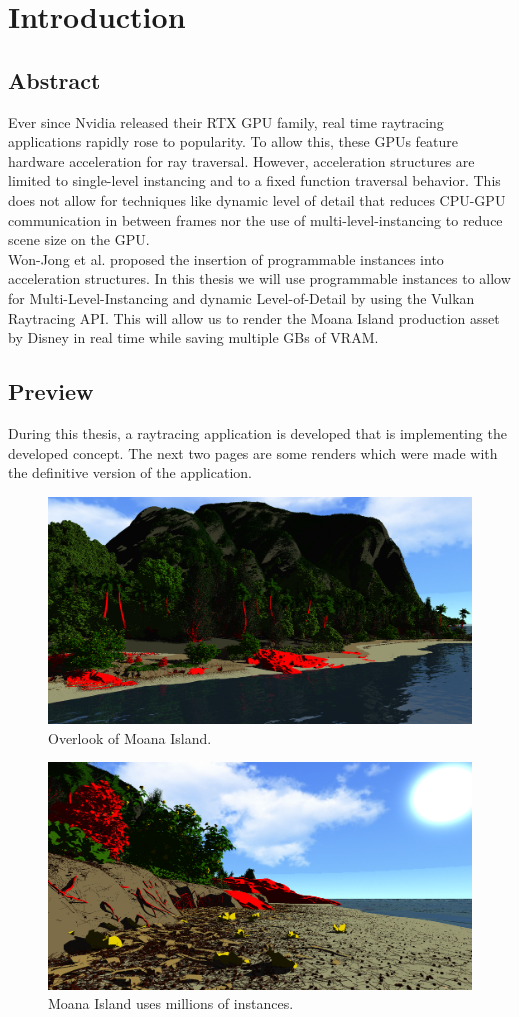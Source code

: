 \chapter{Introduction}
\section{Abstract}
\label{sec:abstract}
Ever since Nvidia released their RTX GPU family, real time raytracing applications rapidly rose to popularity. To allow this, these GPUs feature hardware acceleration for ray traversal. However, acceleration structures are limited to single-level instancing and to a fixed function traversal behavior. This does not allow for techniques like dynamic level of detail that reduces CPU-GPU communication in between frames nor the use of multi-level-instancing to reduce scene size on the GPU.\\ Won-Jong et al. \cite{traversalArticle} proposed the insertion of programmable instances into acceleration structures. In this thesis we will use programmable instances to allow for Multi-Level-Instancing and dynamic Level-of-Detail by using the Vulkan Raytracing API. This will allow us to render the Moana Island production asset by Disney in real time while saving multiple GBs of VRAM.
\section{Preview}
\label{sec:preview}
During this thesis, a raytracing application is developed that is implementing the developed concept. The next two pages are some renders which were made with the definitive version of the application.
\newpage
\begin{figure}
    \centering
    \includegraphics[width=.7\textwidth]{images/preview/Moana Overview.PNG}
    \caption{Overlook of Moana Island.}
    \label{fig:preview-pic3}
\end{figure}

\begin{figure}
    \centering
    \includegraphics[width=.7\textwidth]{images/preview/Moana Beach.PNG}
    \caption{Moana Island uses millions of instances.}
    \label{fig:preview-pic4}
\end{figure}

